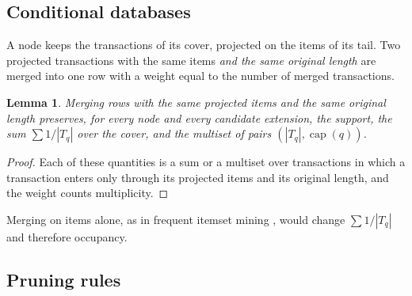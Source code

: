 \documentclass[pdflatex,sn-mathphys,Numbered]{sn-jnl}
\theoremstyle{thmstyleone}
\newtheorem{lemma}[theorem]{Lemma}
\theoremstyle{thmstyletwo}
\theoremstyle{thmstylethree}
\newcommand{\capa}{\operatorname{cap}}
\begin{document}
\subsection{Conditional databases}

A node keeps the transactions of its cover, projected on the items of its tail. Two projected transactions with the same items \emph{and the same original length} are merged into one row with a weight equal to the number of merged transactions.

\begin{lemma}\label{lem:merge}
Merging rows with the same projected items and the same original length preserves, for every node and every candidate extension, the support, the sum $\sum 1/|T_q|$ over the cover, and the multiset of pairs $(|T_q|, \capa(q))$.
\end{lemma}
\begin{proof}
Each of these quantities is a sum or a multiset over transactions in which a transaction enters only through its projected items and its original length, and the weight counts multiplicity.
\end{proof}

Merging on items alone, as in frequent itemset mining \cite{uno2005lcm3}, would change $\sum 1/|T_q|$ and therefore occupancy.

\subsection{Pruning rules}
\end{document}

